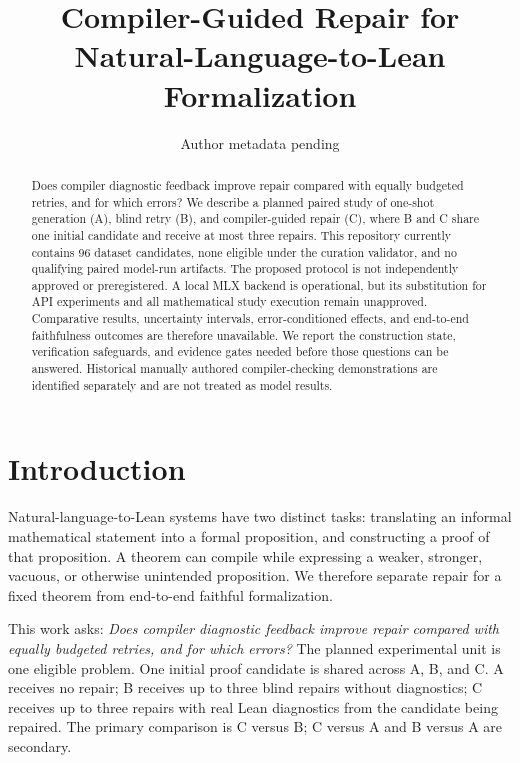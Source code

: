 \documentclass[runningheads,a4paper]{llncs}
\begin{document}
\title{Compiler-Guided Repair for Natural-Language-to-Lean Formalization}
\author{Author metadata pending}
\maketitle

\begin{abstract}
Does compiler diagnostic feedback improve repair compared with equally
budgeted retries, and for which errors? We describe a planned paired study of
one-shot generation (A), blind retry (B), and compiler-guided repair (C),
where B and C share one initial candidate and receive at most three repairs.
This repository currently contains 96 dataset candidates, none eligible under
the curation validator, and no qualifying paired model-run artifacts. The
proposed protocol is not independently approved or preregistered. A local
MLX backend is operational, but its substitution for API experiments and all
mathematical study execution remain unapproved. Comparative results, uncertainty intervals,
error-conditioned effects, and end-to-end faithfulness outcomes are therefore
unavailable. We report the construction state, verification safeguards, and
evidence gates needed before those questions can be answered. Historical
manually authored compiler-checking demonstrations are identified separately
and are not treated as model results.
\end{abstract}

\section{Introduction}
Natural-language-to-Lean systems have two distinct tasks: translating an
informal mathematical statement into a formal proposition, and constructing
a proof of that proposition. A theorem can compile while expressing a weaker,
stronger, vacuous, or otherwise unintended proposition. We therefore separate
repair for a fixed theorem from end-to-end faithful formalization.

This work asks: \emph{Does compiler diagnostic feedback improve repair
compared with equally budgeted retries, and for which errors?} The planned
experimental unit is one eligible problem. One initial proof candidate is
shared across A, B, and C. A receives no repair; B receives up to three blind
repairs without diagnostics; C receives up to three repairs with real Lean
diagnostics from the candidate being repaired. The primary comparison is C
versus B; C versus A and B versus A are secondary.
\end{document}
